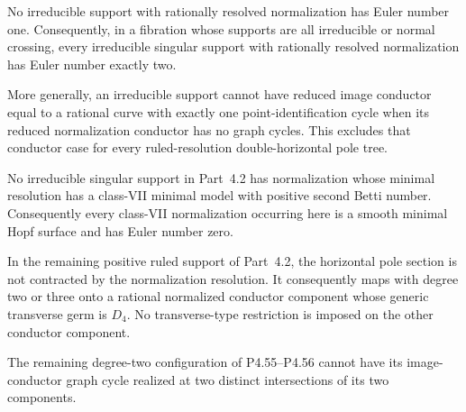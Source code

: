 \begin{proposition}[P4.35]\hypertarget{tag-02X8}{}\label{night:P4.35}\label{stmt:P4.35}


No irreducible support with rationally resolved normalization
has Euler number one. Consequently, in a fibration whose
supports are all irreducible or normal crossing, every
irreducible singular support with rationally resolved
normalization has Euler number exactly two.

More generally, an irreducible support cannot have reduced
image conductor equal to a rational curve with exactly one
point-identification cycle when its reduced normalization
conductor has no graph cycles. This excludes that conductor
case for every ruled-resolution double-horizontal pole tree.
\end{proposition}

\begin{proposition}[P4.37]\hypertarget{tag-02XA}{}\label{night:P4.37}\label{stmt:P4.37}


No irreducible singular support in Part~4.2 has normalization
whose minimal resolution has a class-VII minimal model with
positive second Betti number. Consequently every class-VII
normalization occurring here is a smooth minimal Hopf surface
and has Euler number zero.
\end{proposition}

\begin{proposition}[P4.54]\hypertarget{tag-02XT}{}\label{night:P4.54}\label{stmt:P4.54}


In the remaining positive ruled support of Part~4.2,
the horizontal pole section is not contracted by the
normalization resolution. It consequently maps with
degree two or three onto a rational normalized conductor
component whose generic transverse germ is $D_4$.
No transverse-type restriction is imposed on the other
conductor component.
\end{proposition}

\begin{proposition}[P4.57]\hypertarget{tag-02XW}{}\label{night:P4.57}\label{stmt:P4.57}


The remaining degree-two configuration of P4.55--P4.56
cannot have its image-conductor graph cycle realized at
two distinct intersections of its two components.
\end{proposition}

